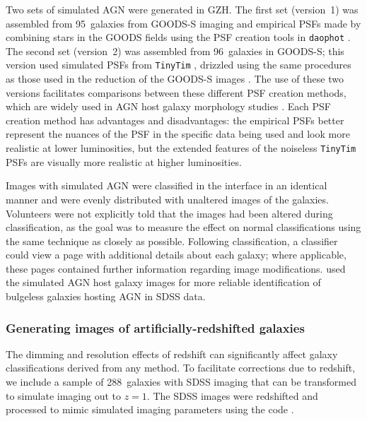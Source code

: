 \documentclass[a4paper,fleqn,usenatbib]{mnras}
\begin{document}
Two sets of simulated AGN were generated in GZH. The first set (version~1) was
assembled from 95~galaxies from GOODS-S imaging and empirical PSFs made by
combining stars in the GOODS fields using the PSF creation tools in
\texttt{daophot} \citep{ste87}.  The second set (version~2) was assembled from 96~galaxies in
GOODS-S; this version used simulated PSFs from \texttt{TinyTim} \citep{kri93},
drizzled using the same procedures as those used in the reduction of the GOODS-S
images \citep{koe02,koe03,gia04}. The use of these two versions facilitates
comparisons between these different PSF creation methods, which are widely used
in AGN host galaxy morphology studies
\citep[e.g.,][]{san04,sim08,pie10a,simm11}.  Each PSF creation method has
advantages and disadvantages: the empirical PSFs better represent the nuances
of the PSF in the specific data being used and look more realistic at lower
luminosities, but the extended features of the noiseless \texttt{TinyTim} PSFs
are visually more realistic at higher luminosities.

Images with simulated AGN were classified in the interface in an identical
manner and were evenly distributed with unaltered images of the galaxies.
Volunteers were not explicitly told that the images had been altered during
classification, as the goal was to measure the effect on normal classifications
using the same technique as closely as possible. Following classification, a
classifier could view a page with additional details about each galaxy; where
applicable, these pages contained further information regarding image
modifications. \citet{sim13} used the simulated AGN host galaxy images for
more reliable identification of bulgeless galaxies hosting AGN in SDSS data.


\subsubsection{Generating images of artificially-redshifted galaxies}\label{ssec:ferengi}

The dimming and resolution effects of redshift can significantly affect galaxy
classifications derived from any method. To facilitate corrections due to
redshift, we include a sample of 288~galaxies with SDSS imaging that can be
transformed to simulate \hst{} imaging out to $z = 1$. 
The SDSS images were redshifted and processed to mimic simulated \hst{} imaging 
parameters using the \ferengi{} code \citep{bar08a}.

 
\end{document}
